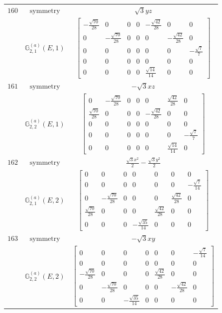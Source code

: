 \documentclass[fleqn,8pt,landscape]{jsarticle}
\begin{document}
\begin{longtable}{ccc}
$ 160 $ & $ \text{symmetry} $ & $ \sqrt{3} y z $ \\
$  $ & $ \mathbb{G}_{2,1}^{(a)}(E,1) $ & $ \begin{bmatrix} - \frac{\sqrt{70}}{28} & 0 & 0 & 0 & - \frac{\sqrt{42}}{28} & 0 & 0 \\ 0 & - \frac{\sqrt{70}}{28} & 0 & 0 & 0 & - \frac{\sqrt{42}}{28} & 0 \\ 0 & 0 & 0 & 0 & 0 & 0 & - \frac{\sqrt{7}}{7} \\ 0 & 0 & 0 & 0 & 0 & 0 & 0 \\ 0 & 0 & 0 & 0 & \frac{\sqrt{14}}{14} & 0 & 0 \end{bmatrix} $ \\ \hline
$ 161 $ & $ \text{symmetry} $ & $ - \sqrt{3} x z $ \\
$  $ & $ \mathbb{G}_{2,2}^{(a)}(E,1) $ & $ \begin{bmatrix} 0 & - \frac{\sqrt{70}}{28} & 0 & 0 & 0 & \frac{\sqrt{42}}{28} & 0 \\ \frac{\sqrt{70}}{28} & 0 & 0 & 0 & - \frac{\sqrt{42}}{28} & 0 & 0 \\ 0 & 0 & 0 & 0 & 0 & 0 & 0 \\ 0 & 0 & 0 & 0 & 0 & 0 & - \frac{\sqrt{7}}{7} \\ 0 & 0 & 0 & 0 & 0 & \frac{\sqrt{14}}{14} & 0 \end{bmatrix} $ \\ \hline
$ 162 $ & $ \text{symmetry} $ & $ \frac{\sqrt{3} x^{2}}{2} - \frac{\sqrt{3} y^{2}}{2} $ \\
$  $ & $ \mathbb{G}_{2,1}^{(a)}(E,2) $ & $ \begin{bmatrix} 0 & 0 & 0 & 0 & 0 & 0 & 0 \\ 0 & 0 & 0 & 0 & 0 & 0 & - \frac{\sqrt{7}}{14} \\ 0 & - \frac{\sqrt{70}}{28} & 0 & 0 & 0 & \frac{\sqrt{42}}{28} & 0 \\ \frac{\sqrt{70}}{28} & 0 & 0 & 0 & \frac{\sqrt{42}}{28} & 0 & 0 \\ 0 & 0 & 0 & - \frac{\sqrt{35}}{14} & 0 & 0 & 0 \end{bmatrix} $ \\ \hline
$ 163 $ & $ \text{symmetry} $ & $ - \sqrt{3} x y $ \\
$  $ & $ \mathbb{G}_{2,2}^{(a)}(E,2) $ & $ \begin{bmatrix} 0 & 0 & 0 & 0 & 0 & 0 & - \frac{\sqrt{7}}{14} \\ 0 & 0 & 0 & 0 & 0 & 0 & 0 \\ - \frac{\sqrt{70}}{28} & 0 & 0 & 0 & \frac{\sqrt{42}}{28} & 0 & 0 \\ 0 & - \frac{\sqrt{70}}{28} & 0 & 0 & 0 & - \frac{\sqrt{42}}{28} & 0 \\ 0 & 0 & - \frac{\sqrt{35}}{14} & 0 & 0 & 0 & 0 \end{bmatrix} $ \\ \hline

\end{longtable}
\end{document}
